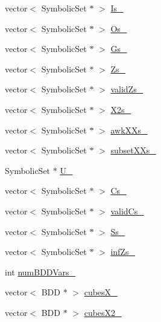 \begin{DoxyCompactItemize}
\item 
vector$<$ Symbolic\+Set $\ast$ $>$ \hyperlink{classscots_1_1Adaptive_a1421430af54b816e57d7cc4db6f1a83d}{Is\+\_\+}
\item 
vector$<$ Symbolic\+Set $\ast$ $>$ \hyperlink{classscots_1_1Adaptive_abed6bfd1256157d4b943078f6486ee36}{Os\+\_\+}
\item 
vector$<$ Symbolic\+Set $\ast$ $>$ \hyperlink{classscots_1_1Adaptive_a4184aca345cd09023c656bc616c2ee9a}{Gs\+\_\+}
\item 
vector$<$ Symbolic\+Set $\ast$ $>$ \hyperlink{classscots_1_1Adaptive_a387e00a300c8c75d3a4eb6181dfab9c4}{Zs\+\_\+}
\item 
vector$<$ Symbolic\+Set $\ast$ $>$ \hyperlink{classscots_1_1Adaptive_af160394c89efaa08d8830a1df066586d}{valid\+Zs\+\_\+}
\item 
vector$<$ Symbolic\+Set $\ast$ $>$ \hyperlink{classscots_1_1Adaptive_a532d1acf3db0235c7bbd551b41a040fc}{X2s\+\_\+}
\item 
vector$<$ Symbolic\+Set $\ast$ $>$ \hyperlink{classscots_1_1Adaptive_ae7e9ac7e500e7f06931138b68ad48aac}{awk\+X\+Xs\+\_\+}
\item 
vector$<$ Symbolic\+Set $\ast$ $>$ \hyperlink{classscots_1_1Adaptive_a8b47913f64f175d3b2b1bebdfcb4ec39}{subset\+X\+Xs\+\_\+}
\item 
Symbolic\+Set $\ast$ \hyperlink{classscots_1_1Adaptive_a89fa563cfea5b9a7bec6a705ca412a18}{U\+\_\+}
\item 
vector$<$ Symbolic\+Set $\ast$ $>$ \hyperlink{classscots_1_1Adaptive_a4937d441ac9758f33bcceeb9975fb1ce}{Cs\+\_\+}
\item 
vector$<$ Symbolic\+Set $\ast$ $>$ \hyperlink{classscots_1_1Adaptive_ad470ad33182f03ad7b3dd5fe9e5271d5}{valid\+Cs\+\_\+}
\item 
vector$<$ Symbolic\+Set $\ast$ $>$ \hyperlink{classscots_1_1Adaptive_a4afb0056b1ab5f1f73b1740806267044}{Ss\+\_\+}
\item 
vector$<$ Symbolic\+Set $\ast$ $>$ \hyperlink{classscots_1_1Adaptive_ad197683891b126e16f0f377d778fd352}{inf\+Zs\+\_\+}
\item 
int \hyperlink{classscots_1_1Adaptive_a753d83283386610f1a2283af5cbeba73}{num\+B\+D\+D\+Vars\+\_\+}
\item 
vector$<$ B\+DD $\ast$ $>$ \hyperlink{classscots_1_1Adaptive_ac82296bd0392bccf2a0e4af9ba70ff37}{cubes\+X\+\_\+}
\item 
vector$<$ B\+DD $\ast$ $>$ \hyperlink{classscots_1_1Adaptive_a6fa7b7542b91ec37ff2358359e425d12}{cubes\+X2\+\_\+}
\item 

\end{DoxyCompactItemize}
